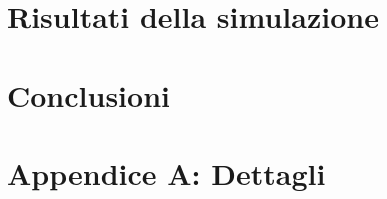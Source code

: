 \documentclass[laurea,oneside,11pt]{USiena_tesiLM}
\begin{document}
\chapter{Risultati della simulazione}

\chapter{Conclusioni}


\backmatter

\appendix
\chapter{Appendice A: Dettagli}
%


%



%

\end{document}
